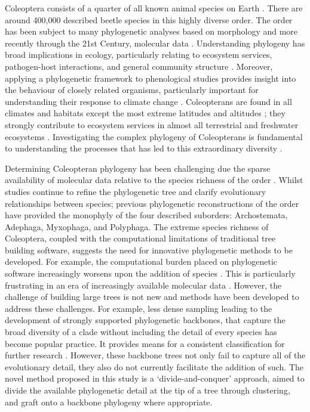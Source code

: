 \documentclass[12pt]{article}
\begin{document}
  Coleoptera consists of a quarter of all known animal species on Earth \cite{YUAN201699}. There are around 400,000 described beetle species in this highly diverse order. The order has been subject to many phylogenetic analyses based on morphology and more recently through the 21st Century, molecular data \cite{orlov}. Understanding phylogeny has broad implications in ecology, particularly relating to ecosystem services, pathogen-host interactions, and general community structure \cite{Davis2010}. Moreover, applying a phylogenetic framework to phenological studies provides insight into the behaviour of closely related organisms, particularly important for understanding their response to climate change \cite{Davis2010}. Coleopterans are found in all climates and habitats except the most extreme latitudes and altitudes \cite{brit}; they strongly contribute to ecosystem services in almost all terrestrial and freshwater ecosystems \cite{Zhang2018}. Investigating the complex phylogeny of Coleopterans is fundamental to understanding the processes that has led to this extraordinary diversity \cite{Zhang2018}.
  
  Determining Coleopteran phylogeny has been challenging due the sparse availability of molecular data relative to the species richness of the order \cite{Zhang2018}. Whilst studies continue to refine the phylogenetic tree and clarify evolutionary relationships between species; previous phylogenetic reconstructions of the order have provided the monophyly of the four described suborders: Archostemata, Adephaga, Myxophaga, and Polyphaga. The extreme species richness of Coleoptera, coupled with the computational limitations of traditional tree building software, suggests the need for innovative phylogenetic methods to be developed. For example, the computational burden placed on phylogenetic software increasingly worsens upon the addition of species \cite{ahmed}. This is particularly frustrating in an era of increasingly available molecular data \cite{Sanderson2003}. However, the challenge of building large trees is not new and methods have been developed to address these challenges. For example, less dense sampling leading to the development of strongly supported phylogenetic backbones, that capture the broad diversity of a clade without including the detail of every species has become popular practice. It provides means for a consistent classification for further research \cite{Xu2022}. However, these backbone trees not only fail to capture all of the evolutionary detail, they also do not currently facilitate the addition of such. The novel method proposed in this study is a `divide-and-conquer' approach, aimed to divide the available phylogenetic detail at the tip of a tree through clustering, and graft onto a backbone phylogeny where appropriate.
  
\end{document}
